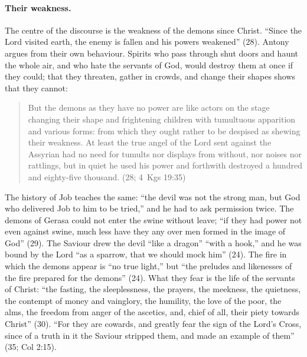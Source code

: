 \paragraph{Their weakness.} The centre of the discourse is the weakness
of the demons since Christ. ``Since the Lord visited earth, the enemy is
fallen and his powers weakened'' (28). Antony argues from their own
behaviour. Spirits who pass through shut doors and haunt the whole air,
and who hate the servants of God, would destroy them at once if they
could; that they threaten, gather in crowds, and change their shapes
shows that they cannot:

\begin{quote}
But the demons as they have no power are like actors on the stage
changing their shape and frightening children with tumultuous apparition
and various forms: from which they ought rather to be despised as shewing
their weakness. At least the true angel of the Lord sent against the
Assyrian had no need for tumults nor displays from without, nor noises
nor rattlings, but in quiet he used his power and forthwith destroyed a
hundred and eighty-five thousand. (28; 4~Kgs 19:35)
\end{quote}

\noindent The history of Job teaches the same: ``the devil was not the
strong man, but God who delivered Job to him to be tried,'' and he had to
ask permission twice. The demons of Gerasa could not enter the swine
without leave; ``if they had power not even against swine, much less have
they any over men formed in the image of God'' (29). The Saviour drew
the devil ``like a dragon'' ``with a hook,'' and he was bound by the Lord ``as a sparrow, that
we should mock him'' (24). The fire in which the demons appear is ``no
true light,'' but ``the preludes and likenesses of the fire prepared for
the demons'' (24). What they fear is the life of the servants of Christ:
``the fasting, the sleeplessness, the prayers, the meekness, the
quietness, the contempt of money and vainglory, the humility, the love of
the poor, the alms, the freedom from anger of the ascetics, and, chief of
all, their piety towards Christ'' (30). ``For they are cowards, and
greatly fear the sign of the Lord's Cross, since of a truth in it the
Saviour stripped them, and made an example of them'' (35; Col 2:15).


